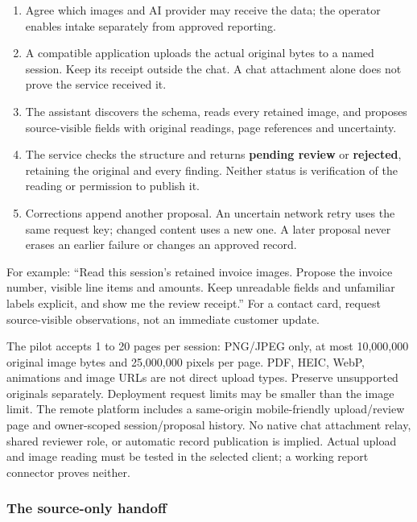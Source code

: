 \documentclass[
]{article}
\providecommand{\tightlist}{%
  \setlength{\itemsep}{0pt}\setlength{\parskip}{0pt}}
\begin{document}
\begin{enumerate}
\def\labelenumi{\arabic{enumi}.}
\tightlist
\item
  Agree which images and AI provider may receive the data; the operator
  enables intake separately from approved reporting.
\item
  A compatible application uploads the actual original bytes to a named
  session. Keep its receipt outside the chat. A chat attachment alone
  does not prove the service received it.
\item
  The assistant discovers the schema, reads every retained image, and
  proposes source-visible fields with original readings, page references
  and uncertainty.
\item
  The service checks the structure and returns \textbf{pending review}
  or \textbf{rejected}, retaining the original and every finding.
  Neither status is verification of the reading or permission to publish
  it.
\item
  Corrections append another proposal. An uncertain network retry uses
  the same request key; changed content uses a new one. A later proposal
  never erases an earlier failure or changes an approved record.
\end{enumerate}

For example: ``Read this session's retained invoice images. Propose the
invoice number, visible line items and amounts. Keep unreadable fields
and unfamiliar labels explicit, and show me the review receipt.'' For a
contact card, request source-visible observations, not an immediate
customer update.

The pilot accepts 1 to 20 pages per session: PNG/JPEG only, at most
10,000,000 original image bytes and 25,000,000 pixels per page. PDF,
HEIC, WebP, animations and image URLs are not direct upload types.
Preserve unsupported originals separately. Deployment request limits may
be smaller than the image limit. The remote platform includes a
same-origin mobile-friendly upload/review page and owner-scoped
session/proposal history. No native chat attachment relay, shared
reviewer role, or automatic record publication is implied. Actual upload
and image reading must be tested in the selected client; a working
report connector proves neither.

\subsubsection{The source-only handoff}\label{the-source-only-handoff}
\end{document}
